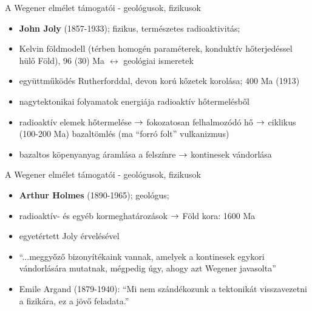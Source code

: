 \begin{frame}{A Wegener elmélet támogatói - geológusok, fizikusok}
    \begin{itemize}
        \item \textbf{John Joly} (1857-1933); fizikus, természetes radioaktivitás;
        \item Kelvin földmodell (térben homogén paraméterek, konduktív hőterjedéssel hülő Föld), 96 (30) Ma $\leftrightarrow$ geológiai ismeretek
        \item együttműködés Rutherforddal, devon korú kőzetek korolása; 400 Ma (1913)
        \item nagytektonikai folyamatok energiája radioaktív hőtermelésből
        \item radioaktív elemek hőtermelése $\rightarrow$ fokozatosan felhalmozódó hő $\rightarrow$ ciklikus (100-200 Ma) bazaltömlés (ma ``forró folt'' vulkanizmus)
        \item bazaltos köpenyanyag áramlása a felszínre $\rightarrow$ kontinesek vándorlása
    \end{itemize}
\end{frame}


\begin{frame}{A Wegener elmélet támogatói - geológusok, fizikusok}
    \begin{itemize}
        \item \textbf{Arthur Holmes} (1890-1965); geológus;
        \item radioaktív- és egyéb kormeghatározások $\rightarrow$ Föld kora: 1600 Ma
        \item egyetértett Joly érvelésével
        \item ``...meggyőző bizonyítékaink vannak, amelyek a kontinesek egykori vándorlására mutatnak, mégpedig úgy, ahogy azt Wegener javasolta''
        \item Emile Argand (1879-1940): ``Mi nem szándékozunk a tektonikát visszavezetni a fizikára, ez a jövő feladata.''
    \end{itemize}
\end{frame}


